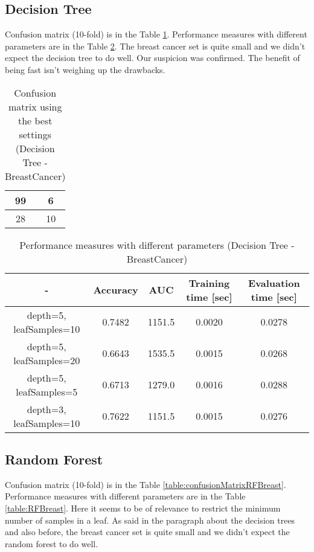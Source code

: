 \documentclass[11pt,a4paper,titlepage]{article}
\begin{document}
  
\subsection{Decision Tree}
Confusion matrix (10-fold) is in the Table \ref{table:confusionMatrixDTBreast}. Performance measures with different parameters are in the Table \ref{table:DTBreast}. The breast cancer set is quite small and we didn't expect the decision tree to do well. Our suspicion was confirmed. The benefit of being fast isn't weighing up the drawbacks.

\begin{table}
  \centering
  \begin{tabular}{| c | c |}
    \hline
   	    99  & 6  \\ \hline
        28  & 10 \\ 
        \hline
  \end{tabular}
  \caption{Confusion matrix using the best settings (Decision Tree - BreastCancer)}
  \label{table:confusionMatrixDTBreast}
  \end{table}
  
  \begin{table}
  \centering
  \begin{tabular}{| c | c | c | c | c |}
    \hline
     		-	   & Accuracy & AUC & Training time [sec] & Evaluation time [sec] \\ \hline
    depth=5, leafSamples=10 &  0.7482	& 1151.5   		& 	0.0020		  & 		0.0278 		\\ \hline
    depth=5, leafSamples=20 &  0.6643	& 1535.5 		& 	0.0015		  & 		0.0268		\\ \hline
    depth=5, leafSamples=5 &  0.6713	& 1279.0 		& 	0.0016		  & 		0.0288 		\\ \hline
    depth=3, leafSamples=10 &  0.7622	& 1151.5  		& 	0.0015		  & 		0.0276		\\ \hline
  \end{tabular}
  \caption{Performance measures with different parameters (Decision Tree - BreastCancer)}
  \label{table:DTBreast}
  \end{table}

\subsection{Random Forest}
Confusion matrix (10-fold) is in the Table \ref{table:confusionMatrixRFBreast}. Performance measures with different parameters are in the Table \ref{table:RFBreast}.
Here it seems to be of relevance to restrict the minimum number of samples in a leaf. As said in the paragraph about the decision trees and also before, the breast cancer set is quite small and we didn't expect the random forest to do well.
\end{document}
